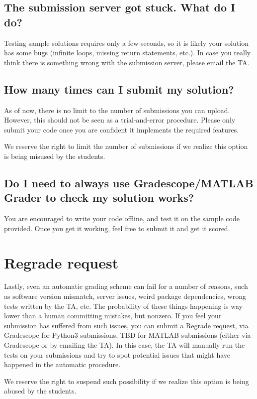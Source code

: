 \documentclass[11pt, reqno]{amsart} %
\begin{document}
\subsection{The submission server got stuck. What do I do?}

Testing sample solutions requires only a few seconds, so it is likely your solution has some bugs (infinite loops, missing return statements, etc.).
In case you really think there is something wrong with the submission server, please email the TA.

\subsection{How many times can I submit my solution?}
As of now, there is no limit to the number of submissions you can upload.
However, this should not be seen as a trial-and-error procedure.
Please only submit your code once you are confident it implements the required features.

We reserve the right to limit the number of submissions if we realize this option is being misused by the students.

\subsection{Do I need to always use Gradescope/MATLAB Grader to check my solution works?}

You are encouraged to write your code offline, and test it on the sample code provided.
Once you get it working, feel free to submit it and get it scored.

\section{Regrade request}

Lastly, even an automatic grading scheme can fail for a number of reasons, such as software version mismatch, server issues,
weird package dependencies, wrong tests written by the TA, etc.
The probability of these things happening is way lower than a human committing mistakes, but nonzero.
If you feel your submission has suffered from such issues, you can submit a Regrade request, via Gradescope for Python3 submissions, TBD for MATLAB submissions (either via Gradescope or by emailing the TA).
In this case, the TA will manually run the tests on your submissions and try to spot potential issues that might have happened in the automatic procedure.

We reserve the right to suspend such possibility if we realize this option is being abused by the students.
\end{document}
